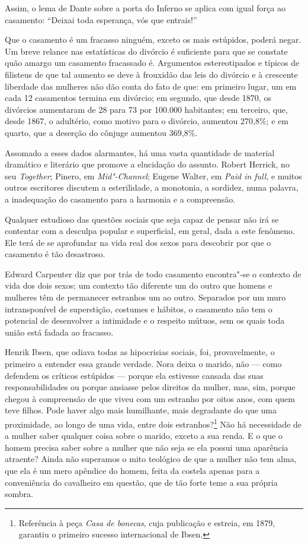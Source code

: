 \begin{multicols}{2}
Assim, o lema de Dante sobre a porta do Inferno se aplica com igual força
ao casamento: ``Deixai toda esperança, vós que entrais!''

Que o casamento é um fracasso ninguém, exceto os mais
estúpidos, poderá negar. Um breve relance nas estatísticas do divórcio é
suficiente para que se constate quão amargo um casamento fracassado é. Argumentos
estereotipados e típicos de filisteus de que tal aumento se deve à frouxidão
das leis do divórcio e à crescente liberdade das mulheres não dão conta
do fato de que: em primeiro lugar, um em cada 12 casamentos termina em
divórcio; em segundo, que desde 1870, os divórcios aumentaram de 28 para
73 por 100.000 habitantes; em terceiro, que, desde 1867, o adultério,
como motivo para o divórcio, aumentou 270,8\%; e em quarto, que a
deserção do cônjuge aumentou 369,8\%.

Assomado a esses dados alarmantes, há uma vasta quantidade de material
dramático e literário que promove a elucidação do assunto. Robert
Herrick, no seu \textit{Together}; Pinero, em \textit{Mid"-Channel}; Eugene
Walter, em \textit{Paid in full}, e muitos outros escritores discutem a
esterilidade, a monotonia, a sordidez, numa palavra, a inadequação do
casamento para a harmonia e a compreensão.

Qualquer estudioso das questões sociais que seja capaz de pensar não irá
se contentar com a desculpa popular e superficial, em geral, dada a este fenômeno. Ele
terá de se aprofundar na vida real dos sexos para descobrir por que o
casamento é tão desastroso.

Edward Carpenter diz que por trás de todo casamento encontra"-se o
contexto de vida dos dois sexos; um contexto tão diferente um do outro
que homens e mulheres têm de permanecer estranhos um ao outro.
Separados por um muro intransponível de superstição, costumes e hábitos,
o casamento não tem o potencial de desenvolver a intimidade e o
respeito mútuos, sem os quais toda união está fadada ao fracasso.

Henrik Ibsen, que odiava todas as hipocrisias sociais, foi, provavelmente,
o primeiro a entender essa grande verdade. Nora deixa o marido,
não --- como defendem os críticos estúpidos --- porque ela estivesse
cansada das suas responsabilidades ou porque ansiasse pelos direitos da
mulher, mas, sim, porque chegou à compreensão de que viveu com um
estranho por oitos anos, com quem teve filhos. Pode haver algo mais
humilhante, mais degradante do que uma proximidade, ao longo de uma
vida, entre dois estranhos?\footnote{Referência à peça \textit{Casa de bonecas}, cuja publicação e estreia, em 1879, garantiu o primeiro sucesso internacional de Ibsen.} Não há necessidade de a mulher saber
qualquer coisa sobre o marido, exceto a sua renda. E o que o homem
precisa saber sobre a mulher que não seja se ela possui uma aparência
atraente? Ainda não superamos o mito teológico de que a mulher não tem
alma, que ela é um mero apêndice do homem, feita da costela apenas para
a conveniência do cavalheiro em questão, que de tão forte teme a sua
própria sombra.\label{ref7}


\end{multicols}
